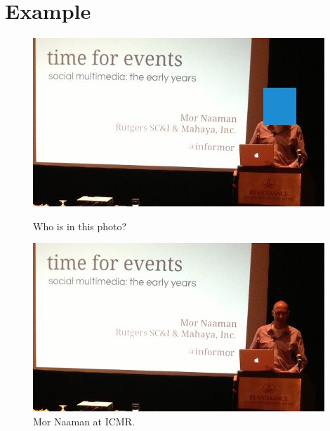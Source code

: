 \section{Example}

\begin{figure}[ht]
\begin{minipage}[b]{0.45\linewidth}
\centering
\includegraphics[width=\textwidth]{media/chapter1/icmr-keynote-2-hidden.jpg}
\caption{Who is in this photo?}
\label{fig:example-icmr-hidden}
\end{minipage}
\hspace{0.5cm}
\begin{minipage}[b]{0.45\linewidth}
\centering
\includegraphics[width=\textwidth]{media/chapter1/icmr-keynote-2-show.jpg}
\caption{Mor Naaman at ICMR.}
\label{fig:example-icmr-show}
\end{minipage}
\end{figure}

